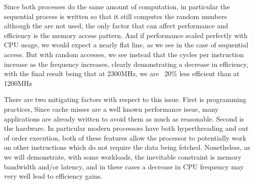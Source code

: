  Since both processes do the same amount of computation, in particular the sequential process is written so that it still computes the random numbers although the are not used, the only factor that can affect performance and efficiency is the memory access pattern. And if performance scaled perfectly with CPU usage, we would expect a nearly flat line, as we see in the case of sequential access. But with random accesses, we see instead that the cycles per instruction increase as the frequency increases, clearly demonstrating a decrease in efficiency, with the final result being that at 2300MHz, we are ~20\% less efficient than at 1200MHz

There are two mitigating factors with respect to this issue. First is programming practices, Since cache misses are a well known performance issue, many applications are already written to avoid them as much as reasonable. Second is the hardware. In particular modern processors have both hyperthreading and out of order execution, both of these features allow the processor to potentially work on other instructions which do not require the data being fetched. Nonetheless, as we will demonstrate, with some workloads, the inevitable constraint is memory bandwidth and/or latency, and in these cases a decrease in CPU frequency may very well lead to efficiency gains.



